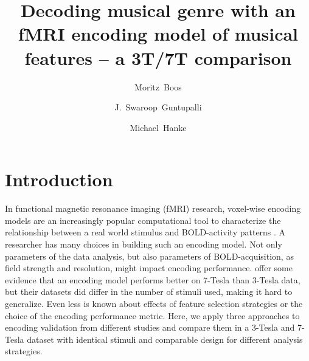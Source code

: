 



\title{Decoding musical genre with an fMRI encoding model of musical
features -- a 3T/7T comparison}


\author[1]{Moritz~Boos}
\author[2]{J.~Swaroop~Guntupalli}
\author[3,4]{Michael~Hanke}

\maketitle
\thispagestyle{fancy}

\listoftodos

\begin{abstract}

\end{abstract}

\clearpage


\section*{Introduction}


In functional magnetic resonance imaging (f{MRI}) research, voxel-wise encoding
models are an increasingly popular computational tool to characterize the
relationship between a real world stimulus and BOLD-activity patterns
\citep{NG11,TD+06,KG+08,SZ09}.
A researcher has many choices in building such an encoding model.
Not only parameters of the data analysis, but also parameters of BOLD-acquisition, as field strength and resolution,
might impact encoding performance. \citet{SF14} offer some evidence that an
encoding model performs better on 7-Tesla than 3-Tesla data, but their datasets
did differ in the number of stimuli used, making it hard to generalize.
Even less is known about effects of feature selection strategies or the choice
of the encoding performance metric. Here, we apply three approaches to encoding validation from
different studies and compare them in a 3-Tesla and 7-Tesla dataset with
identical stimuli and comparable design for different analysis strategies. 

